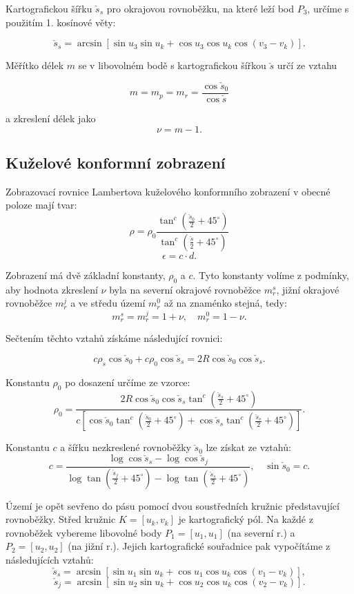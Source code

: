 \documentclass[12pt, a4paper]{article}
\begin{document}
Kartografickou šířku $\check{s}_s$ pro okrajovou rovnoběžku, na které leží bod $P_3$, určíme s použitím 1. kosínové věty:

$$\check{s}_s = \arcsin [\sin u_3 \sin u_k + \cos u_3 \cos u_k \cos(v_3 - v_k)].$$

Měřítko délek $m$ se v libovolném bodě s kartografickou šířkou $\check{s}$ určí ze vztahu 

$$m = m_p = m_r = \frac{\cos \check{s}_0}{\cos \check{s}} $$

a zkreslení délek jako 
$$\nu = m -1.$$

\subsection{Kuželové konformní zobrazení}
Zobrazovací rovnice Lambertova kuželového konformního zobrazení v obecné poloze mají tvar:
$$\rho = \rho_0 \frac{\tan^c\left(\frac{\check{s}_0}{2}+45^\circ\right)}{\tan^c\left(\frac{\check{s}}{2}+45^\circ\right)}$$
$$\epsilon = c \cdot d.$$

Zobrazení má dvě základní konstanty, $\rho_0$ a $c$. Tyto konstanty volíme z podmínky, aby hodnota zkreslení $\nu$ byla na severní okrajové rovnoběžce $m_r^s$, jižní okrajové rovnoběžce $m_r^j$ a ve středu území $m_r^0$ až na znaménko stejná, tedy:
$$
m_r^s = m_r^j = 1+\nu, \quad
m_r^0 = 1-\nu.
$$

Sečtením těchto vztahů získáme následující rovnici: 

$$c \rho_s \cos \check{s}_0 + c \rho_0 \cos \check{s}_s = 2R \cos \check{s}_0 \cos \check{s}_s.$$

Konstantu $\rho_0$ po dosazení určíme ze vzorce:
$$ \rho_0 = \frac{2R \cos \check{s}_0 \cos \check{s}_s \tan^c\left(\frac{\check{s}_s}{2} + 45^\circ\right)}{c\left[\cos \check{s}_0 \tan^c\left(\frac{\check{s}_0}{2} + 45^\circ\right) + \cos \check{s}_s \tan^c\left(\frac{\check{s}_s}{2} + 45^\circ\right)\right]}. $$

Konstantu $c$ a šířku nezkreslené rovnoběžky $\check{s}_0$ lze získat ze vztahů:
$$
c = \frac{\log \cos \check{s}_s - \log \cos \check{s}_j}{\log \tan\left(\frac{\check{s}_j}{2} + 45^\circ\right) - \log \tan\left(\frac{\check{s}_s}{2} + 45^\circ\right)}, \quad
\sin \check{s}_0 = c.
$$

Území je opět sevřeno do pásu pomocí dvou soustředních kružnic představující rovnoběžky. Střed kružnic $K = [u_k, v_k]$ je kartografický pól. Na každé z rovnoběžek vybereme libovolné body $P_1 = [u_1,u_1]$ (na severní r.) a $P_2 = [u_2,u_2]$ (na jižní r.). Jejich kartografické souřadnice pak vypočítáme z následujících vztahů:
$$
\check{s}_s = \arcsin [\sin u_1 \sin u_k + \cos u_1 \cos u_k \cos(v_1 - v_k)], $$
$$\check{s}_j = \arcsin [\sin u_2 \sin u_k + \cos u_2 \cos u_k \cos(v_2 - v_k)].$$
\end{document}
